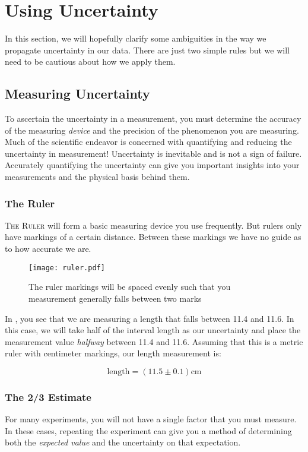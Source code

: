 
\chapter{Using Uncertainty}

In this section, we will hopefully clarify some ambiguities in the way we propagate uncertainty in our data. There are just two simple rules but we will need to be cautious about how we apply them.

\section{Measuring Uncertainty}
To ascertain the uncertainty in a measurement, you must determine the accuracy of the measuring \textit{device} and the precision of the phenomenon you are measuring.  Much of the scientific endeavor is concerned with quantifying and reducing the uncertainty in measurement!  Uncertainty is inevitable and is not a sign of failure.  Accurately quantifying the uncertainty can give you important insights into your measurements and the physical basis behind them.

\subsection{The Ruler}
\textsc{The Ruler} will form a basic measuring device you use frequently.  But rulers only have markings of a certain distance.  Between these markings we have no guide as to how accurate we are.

\begin{figure}
	\texttt{[image: ruler.pdf]}
	\caption[Measuring using a Ruler]{The ruler markings will be spaced evenly such that you measurement generally falls between two marks}
	\label{fig:ruler}
\end{figure}

In , you see that we are measuring a length that falls between 11.4 and 11.6.  In this case, we will take half of the interval length as our uncertainty and place the measurement value \textit{halfway} between 11.4 and 11.6.  Assuming that this is a metric ruler with centimeter markings, our length measurement is:

\begin{equation*}
	\textrm{length}=(11.5\pm0.1)\textrm{cm}
\end{equation*}

\subsection{The 2/3 Estimate}
For many experiments, you will not have a single factor that you must measure.  In these cases, repeating the experiment can give you a method of determining both the \textit{expected value} and the uncertainty on that expectation.

